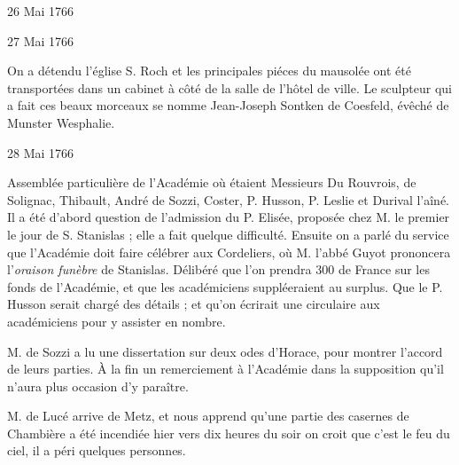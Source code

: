 \begin{diary}{26 Mai 1766}{}
                     \end{diary}

                     \begin{diary}{27 Mai 1766}{}

                         On a détendu l’église S. Roch et les
                              principales piéces du mausolée ont été
                           transportées dans un cabinet à côté
                           de la salle de l'hôtel de ville. Le sculpteur
                           qui a fait ces beaux morceaux se nomme Jean-Joseph
                              Sontken de Coesfeld, évêché de Munster Wesphalie. \bigskip


                     \end{diary}
                     \begin{diary}{28 Mai 1766}{}

                         Assemblée particulière de l'Académie où étaient
                           Messieurs
                           Du Rouvrois, de Solignac, Thibault, André
                           de Sozzi, Coster, P. Husson,
                              P. Leslie et Durival
                              l'aîné. Il a été d'abord question de l'admission
                           du P. Elisée, proposée chez
                           M. le premier le jour
                           de S. Stanislas ; elle a fait quelque difficulté.
                           Ensuite on a parlé du service que l'Académie
                           doit faire célébrer aux Cordeliers, où M.
                              l'abbé Guyot prononcera l'\emph{oraison funèbre} de Stanislas.
                           Délibéré que l'on prendra 300 de France sur
                           les fonds de l'Académie, et
                           que les académiciens suppléeraient au surplus. Que le P. Husson
                           serait chargé des détails ; et qu'on écrirait
                           une circulaire aux académiciens pour y assister
                           en nombre. \bigskip



                           M. de Sozzi a lu une dissertation sur deux
                              odes d'Horace, pour montrer l'accord de leurs
                           parties. À la fin un remerciement à l'Académie
                           dans la supposition qu'il n'aura plus
                           occasion d'y paraître. \bigskip



                           M. de Lucé arrive de Metz, et nous apprend
                           qu'une partie des casernes de
                              Chambière
                           a été incendiée hier vers dix heures du soir
                           on croit que c'est le feu du ciel, il a
                           péri quelques personnes. \bigskip


                     \end{diary}

